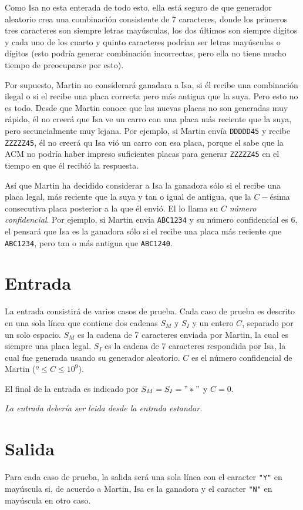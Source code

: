 \documentclass[a4paper,10pt]{article}
\begin{document}
Como Isa no esta enterada de todo esto, ella está seguro de que generador aleatorio crea una combinación consistente de 7 caracteres, donde los primeros tres caracteres son siempre letras mayúsculas, los dos últimos son siempre dígitos y cada uno de los cuarto y quinto caracteres podrían ser letras mayúsculas o dígitos (esto podría generar combinación incorrectas, pero ella no tiene mucho tiempo de preocuparse por esto).

Por supuesto, Martin no considerará ganadara a Isa, si él recibe una combinación ilegal o si el recibe una placa correcta pero más antigua que la suya. Pero esto no es todo. Desde que Martin conoce que las nuevas placas no son generadas muy rápido, él no creerá que Isa ve un carro con una placa más reciente que la suya, pero secuncialmente muy lejana. Por ejemplo, si Martin envía \verb|DDDDD45| y recibe \verb|ZZZZZ45|, él no creerá qu Isa vió un carro con esa placa, porque el sabe que la ACM no podría haber impreso suficientes placas para generar \verb|ZZZZZ45| en el tiempo en que él recibió la respuesta.

Así que Martin ha decidido considerar a Isa la ganadora sólo si el recibe una placa legal, más reciente que la suya y tan o igual de antigua, que la $C-$ésima consecutiva placa posterior a la que él envió. El lo llama su $C$ \emph{número confidencial}. Por ejemplo, si Martin envía \verb|ABC1234| y su número confidencial es 6, el pensará que Isa es la ganadora sólo si el recibe una placa más reciente que \verb|ABC1234|, pero tan o más antigua que \verb|ABC1240|.

\section*{Entrada}

La entrada consistirá de varios casos de prueba. Cada caso de prueba es descrito en una sola línea que contiene dos cadenas $S_M$ y $S_I$ y un entero $C$, separado por un solo espacio. $S_M$ es la cadena de 7 caracteres enviada por Martin, la cual es siempre una placa legal. $S_I$ es la cadena de 7 caracteres respondida por Isa, la cual fue generada usando su generador aleatorio. $C$ es el número confidencial de Martin ($º \leq C \leq 10^9$).

El final de la entrada es indicado por $S_M = S_I = "*"$ y $C = 0$.

\emph{La entrada debería ser leida desde la entrada estandar.}

\section*{Salida}
Para cada caso de prueba, la salida será una sola línea con el caracter \verb|"Y"| en mayúscula si, de acuerdo a Martin, Isa es la ganadora y el caracter \verb|"N"| en mayúscula en otro caso.
\end{document}
